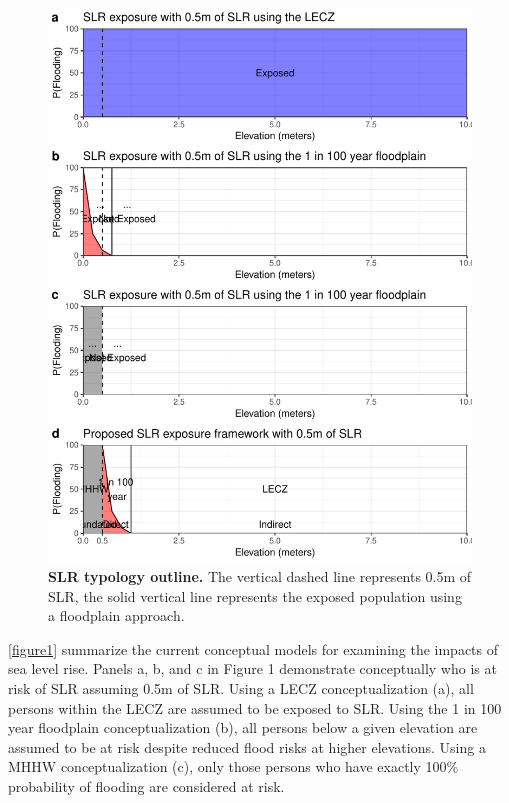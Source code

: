 \documentclass[12pt,]{article}
\makeatletter
\def\maxwidth{\ifdim\Gin@nat@width>\linewidth\linewidth
\else\Gin@nat@width\fi}
\let\Oldincludegraphics\includegraphics
\renewcommand{\includegraphics}[1]{\Oldincludegraphics[width=\maxwidth]{#1}}
\makeatother
\begin{document}
\begin{figure}
\centering
\includegraphics{SLR_typology_files/figure-latex/pastexamples-1.pdf}
\caption{\textbf{SLR typology outline.} The vertical dashed line
represents 0.5m of SLR, the solid vertical line represents the exposed
population using a floodplain approach. \label{figure1}}
\end{figure}

\autoref{figure1} summarize the current conceptual models for examining
the impacts of sea level rise. Panels a, b, and c in Figure 1
demonstrate conceptually who is at risk of SLR assuming 0.5m of SLR.
Using a LECZ conceptualization (a), all persons within the LECZ are
assumed to be exposed to SLR. Using the 1 in 100 year floodplain
conceptualization (b), all persons below a given elevation are assumed
to be at risk despite reduced flood risks at higher elevations. Using a
MHHW conceptualization (c), only those persons who have exactly 100\%
probability of flooding are considered at risk.
\end{document}
